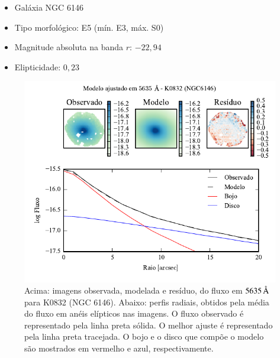 \begin{itemize}
  \item Galáxia NGC 6146
  \item Tipo morfológico: E5 (mín. E3, máx. S0)
  \item Magnitude absoluta na banda $r$: $-22,94$
  \item Elipticidade: $0,23$
\end{itemize}


\begin{figure}
	\includegraphics[page=1]{figuras-decomp/K0832_sample006a}
	\caption[Ajuste morfológico em $5635\,\angstrom$ de K0832 (NGC 6146)]
	{Acima: imagens observada, modelada e resíduo, do fluxo em $5635\,\angstrom$
	para K0832 (NGC 6146). Abaixo: perfis radiais, obtidos pela média do fluxo em
	anéis elípticos nas imagens. O fluxo observado é representado pela linha preta
	sólida. O melhor ajuste é representado pela linha preta tracejada. O bojo e o
	disco que compõe o modelo são mostrados em vermelho e azul, respectivamente.}
	\label{fig:decompRadprof:K0832}
\end{figure}

